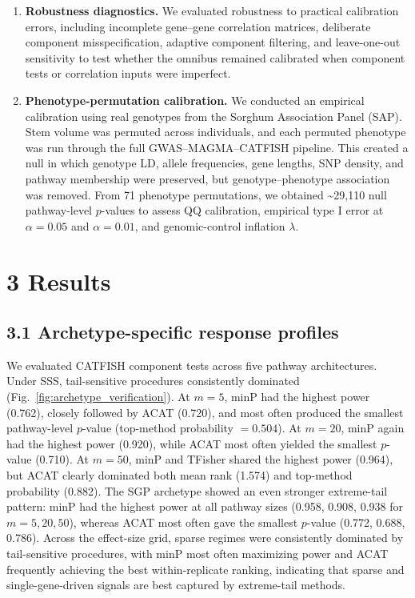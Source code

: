 \documentclass[unnumsec,webpdf,contemporary,large]{oup-authoring-template}%
\theoremstyle{thmstyleone}%
\theoremstyle{thmstyletwo}%
\theoremstyle{thmstylethree}%
\begin{document}
\begin{enumerate}
\item \textbf{Robustness diagnostics.}
We evaluated robustness to practical calibration errors, including incomplete gene--gene correlation matrices, deliberate component misspecification, adaptive component filtering, and leave-one-out sensitivity to test whether the omnibus remained calibrated when component tests or correlation inputs were imperfect.

\item \textbf{Phenotype-permutation calibration.}
We conducted an empirical calibration using real genotypes from the Sorghum Association Panel (SAP). Stem volume was permuted across individuals, and each permuted phenotype was run through the full GWAS--MAGMA--CATFISH pipeline. This created a null in which genotype LD, allele frequencies, gene lengths, SNP density, and pathway membership were preserved, but genotype–phenotype association was removed. From 71 phenotype permutations, we obtained \textasciitilde29,110 null pathway-level $p$-values to assess QQ calibration, empirical type I error at $\alpha=0.05$ and $\alpha=0.01$, and genomic-control inflation $\lambda$.

\end{enumerate}


\section{3 Results}

\subsection*{3.1 Archetype-specific response profiles}

We evaluated CATFISH component tests across five pathway architectures. Under SSS, tail-sensitive procedures consistently dominated (Fig.~\ref{fig:archetype_verification}). At \(m=5\), minP had the highest power (0.762), closely followed by ACAT (0.720), and most often produced the smallest pathway-level \(p\)-value (top-method probability \(=0.504\)). At \(m=20\), minP again had the highest power (0.920), while ACAT most often yielded the smallest \(p\)-value (0.710). At \(m=50\), minP and TFisher shared the highest power (0.964), but ACAT clearly dominated both mean rank (1.574) and top-method probability (0.882). The SGP archetype showed an even stronger extreme-tail pattern: minP had the highest power at all pathway sizes (0.958, 0.908, 0.938 for \(m=5,20,50\)), whereas ACAT most often gave the smallest \(p\)-value (0.772, 0.688, 0.786). Across the effect-size grid, sparse regimes were consistently dominated by tail-sensitive procedures, with minP most often maximizing power and ACAT frequently achieving the best within-replicate ranking, indicating that sparse and single-gene-driven signals are best captured by extreme-tail methods.
\end{document}
